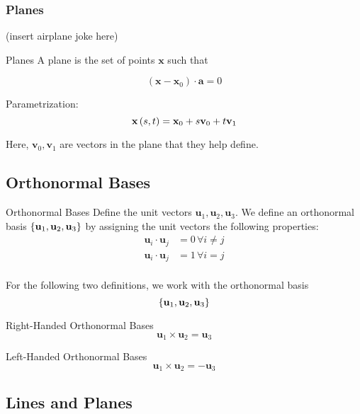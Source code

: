 \documentclass[11pt]{article}
\begin{document}
\subsubsection{Planes}
(insert airplane joke here)


\begin{definition}{Planes}
  A plane is the set of points $\bm{x}$ such that
  
  $$(\bm{x} - \bm{x}_0) \cdot \bm{a} = 0$$

  Parametrization:
  $$\textbf{x} \left ( s, t \right) = \textbf{x}_0 + s \textbf{v}_0 + t \textbf{v}_1$$

  Here, $\bm{v}_0, \bm{v}_1$ are vectors in the plane that they help define.
  
\end{definition}


\subsection{Orthonormal Bases}

\begin{definition}{Orthonormal Bases}
  Define the unit vectors $\bm{u}_1, \bm{u}_2, \bm{u}_3$.
  We define an orthonormal basis $\left \{ \textbf{u}_1, \textbf{u}_2, \textbf{u}_3 \right \}$ by assigning the unit vectors the following properties:
  \begin{align*}
    \bm{u}_i \cdot \bm{u}_j &= 0\, \forall i \neq j \\
    \bm{u}_i \cdot \bm{u}_j &= 1\, \forall i = j \\
  \end{align*}
\end{definition}

For the following two definitions, we work with the orthonormal basis
$$\left \{ \textbf{u}_1, \textbf{u}_2, \textbf{u}_3 \right \}$$

\begin{definition}{Right-Handed Orthonormal Bases}
  $$
  \bm{u}_1 \times \bm{u}_2 = \bm{u}_3
  $$
\end{definition}

\begin{definition}{Left-Handed Orthonormal Bases}
  $$
  \bm{u}_1 \times \bm{u}_2 = - \bm{u}_3
  $$
\end{definition}



\subsection{Lines and Planes}
\end{document}
